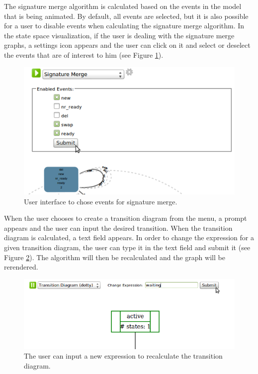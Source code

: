 The signature merge algorithm is calculated based on the events in the model that is being animated. By default, all events are selected, but it is also possible for a user to disable events when calculating the signature merge algorithm. In the state space visualization, if the user is dealing with the signature merge graphs, a settings icon appears and the user can click on it and select or deselect the events that are of interest to him (see Figure \ref{sigMergeUI}).  

\begin{center}
\begin{figure}[h!]
\includegraphics[width=14cm]{bilder/sigMergeUI.png}
\caption{User interface to chose events for signature merge.}
\label{sigMergeUI}
\end{figure}
\end{center}

When the user chooses to create a transition diagram from the menu, a prompt appears and the user can input the desired transition. When the transition diagram is calculated, a text field appears. In order to change the expression for a given transition diagram, the user can type it in the text field and submit it (see Figure \ref{transDiagUI}). The algorithm will then be recalculated and the graph will be rerendered.

\begin{center}
\begin{figure}[h!]
\includegraphics[width=14cm]{bilder/transDiag-UI.png}
\caption{The user can input a new expression to recalculate the transition diagram.}
\label{transDiagUI}
\end{figure}
\end{center}

